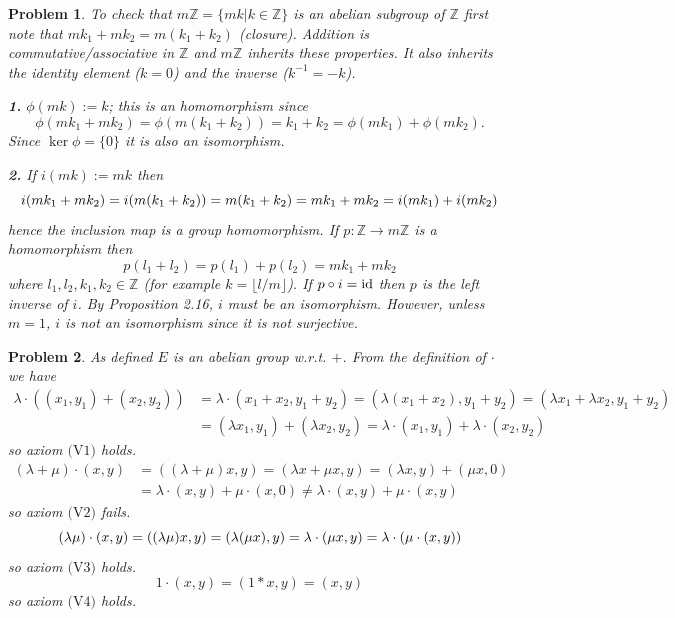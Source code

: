 \documentclass{article}
\theoremstyle{pprop}
\newtheorem{problem}{Problem}[section]
\begin{document}
\begin{problem}
  To check that $m\mathbb{Z}=\{mk \vert k\in \mathbb{Z}\}$ is an abelian subgroup of $\mathbb{Z}$ first note that 
  $mk_1+mk_2=m(k_1+k_2)$ (closure). Addition is commutative/associative in $\mathbb{Z}$ and $m\mathbb{Z}$ inherits these 
  properties. It also inherits the identity element ($k=0$) and the inverse ($k^{-1}=-k$).
  \par\noindent\textbf{1.} $\phi(mk):=k$; this is an homomorphism since 
$$
\phi(mk_1+mk_2)=\phi(m(k_1+k_2))=k_1+k_2=\phi(mk_1)+\phi(mk_2).
$$
Since $\ker\phi=\{0\}$ it is also an isomorphism.
\par\noindent\textbf{2.} If $i(mk):=mk$ then
$$
i(mk_1+mk_2)=i(m(k_1+k_2))=m(k_1+k_2)=\\mk_1+mk_2=
i(mk_1)+i(mk_2)
$$
hence the inclusion map is a group homomorphism. If $p:\mathbb{Z} \to m\mathbb{Z}$ is a homomorphism then
$$
p (l_1+l_2)=p(l_1)+p(l_2)=mk_1+m k_2
$$
where $l_1,l_2,k_1,k_2 \in \mathbb{Z}$ (for example $k=\lfloor l/m  \rfloor$). If $p \circ i={\rm id}$ then $p$ is the 
left inverse of $i$. By Proposition 2.16, $i$ must be an isomorphism. However, unless $m=1$, $i$ is not an isomorphism since 
it is not surjective.
\end{problem}
\begin{problem}
  As defined $E$ is an abelian group w.r.t. $+$.
From the definition of $\cdot$ we have 
\begin{align*}
\lambda\cdot((x_1,y_1)+(x_2,y_2)) & =\lambda\cdot(x_1+x_2,y_1+y_2) 
=(\lambda(x_1+x_2),y_1+y_2)=(\lambda x_1+\lambda x_2,y_1+y_2)\\
& =(\lambda x_1,y_1)+(\lambda x_2,y_2)=\lambda\cdot(x_1,y_1)+\lambda\cdot(x_2,y_2)
\end{align*}
so axiom $\text{(V1)}$ holds. 
\begin{align*}
(\lambda + \mu) \cdot (x,y) & =((\lambda+\mu)x,y)=(\lambda x + \mu x,y) =(\lambda x,y)+(\mu x,0) \\
& =\lambda\cdot(x,y)+\mu\cdot(x,0)\neq\lambda\cdot(x,y)+\mu\cdot(x,y)
\end{align*}
so axiom $\text{(V2)}$ fails.
$$
(\lambda \mu)\cdot(x,y)=((\lambda\mu)x,y)=(\lambda(\mu x),y)\\=\lambda\cdot(\mu x,y)=\lambda\cdot(\mu\cdot(x,y))
$$
so axiom $\text{(V3)}$ holds.
$$
1\cdot(x,y)=(1*x,y)=(x,y)
$$
so axiom $\text{(V4)}$ holds.
\end{problem}
\end{document}
